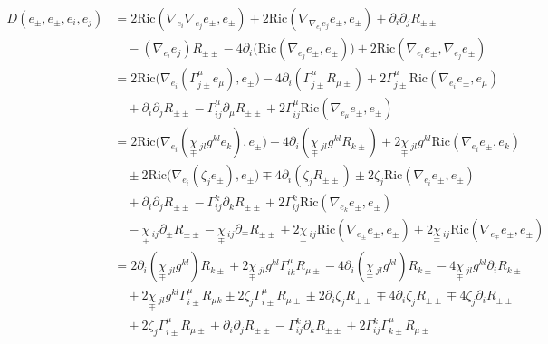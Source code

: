 \documentclass[a4paper,11pt]{article}
\newcommand{\R}{{\mathrm{Ric}}}
\begin{document}
\begin{align*}
    D(e_\pm,e_\pm,e_i,e_j) 
    &= 2 \R(\nabla_{e_i}\nabla_{e_j} e_\pm ,e_\pm )
    + 2 \R(\nabla_{\nabla_{e_i}e_j} e_\pm ,e_\pm )
    + \partial_i \partial_j R_{\pm\pm}\\
    & \quad
    -(\nabla_{e_i} e_j) R_{\pm\pm}
    -4 \partial_i\big(\R(\nabla_{e_j} e_\pm , e_\pm )\big)
    + 2 \R(\nabla_{e_i} e_\pm , \nabla_{e_j} e_\pm )\\
    &= 2 \R\big(\nabla_{e_i}(\Gamma_{j\pm}^\mu e_\mu) ,e_\pm \big)
    -4 \partial_i(\Gamma_{j\pm}^\mu R_{\mu\pm})
    + 2 \Gamma_{j\pm}^\mu \R(\nabla_{e_i} e_\pm , e_\mu )\\
    & \quad
    + \partial_i \partial_j R_{\pm\pm}
    -\Gamma_{ij}^\mu \partial_\mu R_{\pm\pm}
    + 2 \Gamma_{ij}^\mu \R(\nabla_{e_\mu} e_\pm ,e_\pm )\\
    &= 2 \R\big(\nabla_{e_i}(\underset{\mp}{\chi}\,_{jl}g^{kl} e_k ) ,e_\pm \big)
    -4 \partial_i(\underset{\mp}{\chi}\,_{jl}g^{kl}  R_{k \pm})
    + 2 \underset{\mp}{\chi}\,_{jl}g^{kl}  \R(\nabla_{e_i} e_\pm , e_k  )\\
    &\quad
    \pm 2 \R\big(\nabla_{e_i}(\zeta_j e_\pm) ,e_\pm \big)
    \mp 4 \partial_i(\zeta_j R_{\pm\pm})
    \pm 2 \zeta_j \R(\nabla_{e_i} e_\pm , e_\pm )\\
    & \quad
    + \partial_i \partial_j R_{\pm\pm}
    -\Gamma_{ij}^k \partial_k R_{\pm\pm}
    + 2 \Gamma_{ij}^k \R(\nabla_{e_k} e_\pm ,e_\pm )\\
    & \quad
    -\underset{\pm}{\chi}\,_{ij} \partial_\pm R_{\pm\pm}
    -\underset{\mp}{\chi}\,_{ij} \partial_\mp R_{\pm\pm}
    + 2 \underset{\pm}{\chi}\,_{ij} \R(\nabla_{e_\pm} e_\pm ,e_\pm )
    + 2 \underset{\mp}{\chi}\,_{ij} \R(\nabla_{e_\mp} e_\pm ,e_\pm )\\
    &= 2 \partial_i(\underset{\mp}{\chi}\,_{jl}g^{kl}) R_{k\pm}
    + 2 \underset{\mp}{\chi}\,_{jl}g^{kl} \Gamma_{ik}^\mu R_{\mu\pm}
    -4 \partial_i(\underset{\mp}{\chi}\,_{jl}g^{kl})  R_{k \pm}
    -4 \underset{\mp}{\chi}\,_{jl}g^{kl}  \partial_i R_{k \pm}\\
    &\quad
    + 2 \underset{\mp}{\chi}\,_{jl}g^{kl} \Gamma_{i\pm}^\mu R_{\mu k}
    \pm 2 \zeta_j \Gamma_{i\pm}^\mu R_{\mu\pm}
    \pm 2 \partial_i \zeta_j R_{\pm\pm}
    \mp 4 \partial_i\zeta_j R_{\pm\pm}
    \mp 4 \zeta_j \partial_i R_{\pm\pm}\\
    & \quad
    \pm 2 \zeta_j \Gamma_{i\pm}^\mu R_{\mu\pm}
    + \partial_i \partial_j R_{\pm\pm}
    -\Gamma_{ij}^k \partial_k R_{\pm\pm}
    + 2 \Gamma_{ij}^k \Gamma_{k\pm}^\mu R_{\mu\pm}

\end{align*}
\end{document}
